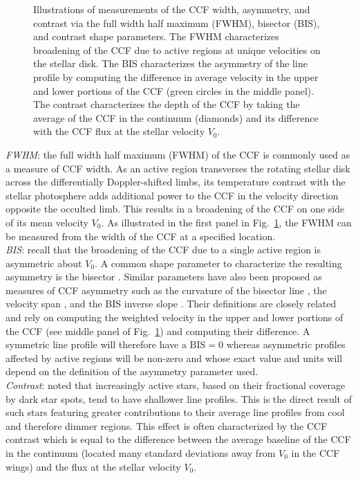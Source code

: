 \begin{figure}
  \centering
  \caption[Illustrations of CCF shape parameters.]
          {Illustrations of measurements of the CCF width, asymmetry, and contrast via the full
            width half maximum (FWHM), bisector (BIS), and contrast shape parameters. The FWHM
            characterizes broadening of the CCF due to active regions at unique velocities on the
            stellar disk. The
            BIS characterizes the asymmetry of the line profile by computing the difference in
            average velocity in the upper and lower portions of the CCF (green circles in the
            middle panel). The contrast characterizes the depth of the CCF by taking the average
            of the CCF in the continuum (diamonds) and its difference with the CCF flux at the
            stellar velocity $V_0$.}
  \label{fig:ccf}
\end{figure}

\emph{FWHM}:
the full width half maximum (FWHM) of the CCF is commonly used as a measure of CCF
width. As an active region transverses the rotating stellar disk across the differentially
Doppler-shifted limbs, its temperature contrast with the stellar photosphere adds additional
power to the CCF in the velocity direction opposite the occulted limb. This results in a
broadening of the CCF on one side of its mean velocity $V_0$. As illustrated in
the first panel in Fig.~\ref{fig:ccf},
the FWHM can be measured from the width of the CCF at a specified location. \\

\emph{BIS}:
recall that the broadening of the CCF due to a single active region is asymmetric about $V_0$.
A common shape parameter to characterize the resulting asymmetry is the bisector
\citep[BIS;][]{queloz01}.
Similar parameters have also been proposed as measures of CCF asymmetry such as the curvature of
the bisector line \citep{hatzes96}, the velocity span \citep{boisse11}, and the BIS inverse
slope \citep{queloz01}. Their definitions are closely related and rely on computing the weighted
velocity in the upper and lower portions of the CCF (see middle panel of Fig.~\ref{fig:ccf})
and computing their difference. A symmetric line profile will therefore have a BIS$=0$ whereas
asymmetric profiles affected by active regions will be non-zero and whose exact value and units
will depend on the definition of the asymmetry parameter used. \\

\emph{Contrast}:
\citep{boisse09} noted that increasingly active stars, based on their fractional coverage by dark
star spots, tend to have shallower line profiles. This is the direct result of such stars featuring
greater contributions to their average line profiles from cool and therefore dimmer regions.
This effect is often characterized by the CCF contrast which is equal to the difference between the
average baseline of the CCF in the continuum (located many standard deviations away from $V_0$ in
the CCF wings) and the flux at the stellar velocity $V_0$.


